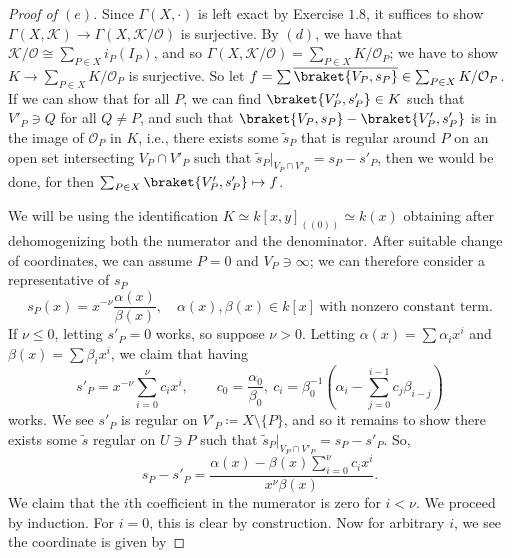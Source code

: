 \documentclass[10pt]{article}
\theoremstyle{definition}
\theoremstyle{remark}
\numberwithin{equation}{section}
\numberwithin{figure}{subsubsection}
\newcommand{\OO}{\mathcal{O}}
\begin{document}
\begin{proof}[Proof of $(e)$]
  Since $\Gamma(X,\cdot)$ is left exact by Exercise $1.8$, it suffices to show
  $\Gamma(X,\mathscr{K}) \to \Gamma(X,\mathscr{K}/\mathscr{O})$ is surjective.
  By $(d)$, we have that $\mathscr{K}/\mathscr{O} \cong \sum_{P \in X}
  i_P(I_P)$, and so $\Gamma(X,\mathscr{K}/\mathscr{O}) = \sum_{P \in X}
  K/\OO_P$; we have to show $K \to \sum_{P \in X} K/\OO_P$ is surjective. So let
  $f = \sum \overline{\braket{V_P,s_P}} \in \sum_{P \in X} K/\OO_P$.
  If we can show that for all $P$, we can find $\braket{V'_P,s'_P} \in
  K$ such that $V'_P \ni Q$ for all $Q \ne P$,
  and such that $\braket{V_P,s_P} - \braket{V'_P,s'_P}$ is in the image of
  $\OO_P$ in $K$, i.e., there exists some $\tilde{s}_P$ that is regular around $P$
  on an open set intersecting $V_P \cap V'_P$ such that $\tilde{s}_P\rvert_{V_P \cap
  V'_P} = s_P - s'_P$, then we would be done, for then
  $\sum_{P \in X} \braket{V'_P,s'_P} \mapsto f$.
  \par We will be using the identification $K \simeq k[x,y]_{((0))} \simeq
  k(x)$ obtaining after dehomogenizing both the numerator and the denominator.
  After suitable change of coordinates, we can assume $P = 0$ and
  $V_P \ni \infty$; we can therefore consider a representative of $s_P$
  \begin{equation*}
    s_P(x) = x^{-\nu} \frac{\alpha(x)}{\beta(x)}, \quad \alpha(x),\beta(x) \in k[x]~\text{with nonzero constant term}.
  \end{equation*}
  If $\nu \le 0$, letting $s'_P = 0$ works, so suppose $\nu > 0$. Letting $\alpha(x) = \sum \alpha_i x^i$ and $\beta(x) = \sum \beta_i x^i$, we claim that having
  \begin{equation*}
    s'_P = x^{-\nu}\sum_{i=0}^\nu c_ix^i, \qquad 
    c_0 = \frac{\alpha_0}{\beta_0},~c_i = \beta_0^{-1}\left(\alpha_i - \sum_{j=0}^{i-1} c_j\beta_{i-j}\right)
  \end{equation*}
  works. We see $s'_P$ is regular on $V'_P \coloneqq X \setminus \{P\}$, and so
  it remains to show there exists some $\tilde{s}$ regular on $U \ni P$ such
  that $\tilde{s}_P\rvert_{V_P \cap V'_P} = s_P - s'_P$. So,
  \begin{equation}\label{sspugh}
    s_P - s'_P = \frac{\alpha(x) - \beta(x)\sum_{i=0}^\nu c_ix^i}{x^\nu\beta(x)}.
  \end{equation}
  We claim that the $i$th coefficient in the numerator is zero for $i < \nu$. We proceed by induction. For $i=0$, this is clear by construction. Now for arbitrary $i$, we see the coordinate is given by

\end{proof}
\end{document}
